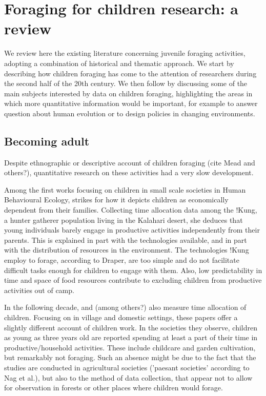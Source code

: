 \section{Foraging for children research: a review}
We review here the existing literature concerning juvenile foraging activities, adopting a combination of historical and thematic approach. We start by describing how children foraging has come to the attention of researchers during the second half of the 20th century. We then follow by discussing some of the main subjects interested by data on children foraging, highlighting the areas in which more quantitative information would be important, for example to answer question about human evolution or to design policies in changing environments.

\subsection{Becoming adult}
Despite ethnographic or descriptive account of children foraging (cite Mead and others?), quantitative research on these activities had a very slow development.

Among the first works focusing on children in small scale societies in Human Behavioural Ecology, \cite{lee_social_1976} strikes for how it depicts children as economically dependent from their families. Collecting time allocation data among the !Kung, a hunter gatherer population living in the Kalahari desert, she deduces that young individuals barely engage in productive activities independently from their parents. This is explained in part with the technologies available, and in part with the distribution of resources in the environment. The technologies !Kung employ to forage, according to Draper, are too simple and do not facilitate difficult tasks enough for children to engage with them. Also, low predictability in time and space of food resources contribute to excluding children from productive activities out of camp. 

In the following decade, \cite{nag_anthropological_1978} and \cite{munroe_childrens_1984} (among others?) also measure time allocation of children. Focusing on in village and domestic settings, these papers offer a slightly different account of children work. In the societies they observe, children as young as three years old are reported spending at least a part of their time in productive/household activities. These include childcare and garden cultivation, but remarkably not foraging. Such an absence might be due to the fact that the studies are conducted in agricultural societies ('paesant societies' according to Nag et al.), but also to the method of data collection, that appear not to allow for observation in forests or other places where children would forage. 

